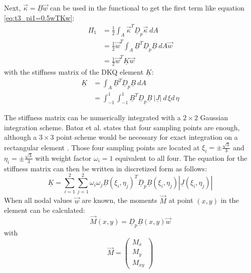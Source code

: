   Next, $\vec{\kappa} = \underline{B} \vec{w}$ can be used in the functional to get the first term like equation \eqref{eq:t3_pi1=0.5wTKw}:
  \begin{align}
  \Pi_1 &= \frac{1}{2} \int_A \vec{\kappa}^T \underline{D}_p \vec{\kappa}\ d\!A \nonumber\\
  &= \frac{1}{2} \vec{w}^T \int_A \underline{B}^T \underline{D}_p \underline{B}\ d\!A \vec{w}\nonumber\\
  &= \frac{1}{2} \vec{w}^T \underline{K} \vec{w} \nonumber
  \end{align}
  with the stiffness matrix of the DKQ element $\underline{K}$:
  \begin{align}
  \underline{K} &= \int_A \underline{B}^T \underline{D}_p \underline{B}\ d\!A \nonumber\\
  &= \int_{-1}^{1} \int_{-1}^{1} \underline{B}^T \underline{D}_p \underline{B}\ \left|\underline{J}\right|\ d\,\!\xi d\,\!\eta
  \end{align}
  
  The stiffness matrix can be numerically integrated with a $2\!\times\!2$ Gaussian integration scheme. Batoz et al. states that four sampling points are enough, although a $3\!\times\!3$ point scheme would be necessary for exact integration on a rectangular element \cite{batoz1982evaluation}. Those four sampling points are located at $\xi_i = \pm \frac{\sqrt{3}}{3}$ and $\eta_i = \pm \frac{\sqrt{3}}{3}$ with weight factor $\omega_i = 1$ equivalent to all four. The equation for the stiffness matrix can then be written in discretized form as follows:
  \begin{equation}
  \underline{K} = \sum_{i=1}^{2} \sum_{j=1}^{2} \omega_i \omega_j \underline{B}(\xi_i,\eta_j)^T \underline{D}_p \underline{B}(\xi_i,\eta_j) \left|\underline{J}(\xi_i,\eta_j)\right|
  \end{equation}
  When all nodal values $\vec{w}$ are known, the moments $\vec{M}$ at point $(x,y)$ in the element can be calculated:
  \begin{equation}
  \vec{M}(x,y) = \underline{D}_p \underline{B}(x,y) \vec{w}
  \end{equation}
  with
  \begin{equation}
  \vec{M} = \begin{pmatrix}
  M_x\\M_y\\M_{xy}
  \end{pmatrix}
  \end{equation}
 

